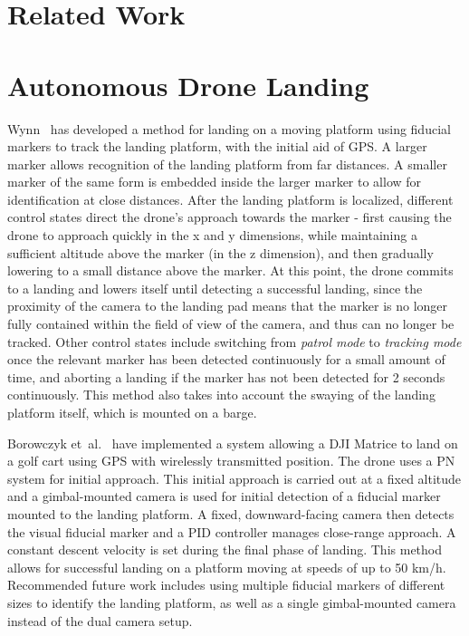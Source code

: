 \section{Related Work}

\section{Autonomous Drone Landing}

Wynn~\cite{wynn} has developed a method for landing on a moving platform using fiducial markers to track the landing platform, with the initial aid of GPS. A larger marker allows recognition of the landing platform from far distances. A smaller marker of the same form is embedded inside the larger marker to allow for identification at close distances. After the landing platform is localized, different control states direct the drone's approach towards the marker - first causing the drone to approach quickly in the x and y dimensions, while maintaining a sufficient altitude above the marker (in the z dimension), and then gradually lowering to a small distance above the marker. At this point, the drone commits to a landing and lowers itself until detecting a successful landing, since the proximity of the camera to the landing pad means that the marker is no longer fully contained within the field of view of the camera, and thus can no longer be tracked. Other control states include switching from \textit{patrol mode} to \textit{tracking mode} once the relevant marker has been detected continuously for a small amount of time, and aborting a landing if the marker has not been detected for 2 seconds continuously. This method also takes into account the swaying of the landing platform itself, which is mounted on a barge. 

Borowczyk et~al.~\cite{high_velocity_landing} have implemented a system allowing a DJI Matrice to land on a golf cart using  {GPS} with wirelessly transmitted position. The drone uses a {PN} system for initial approach. This initial approach is carried out at a fixed altitude and a gimbal-mounted camera is used for initial detection of a fiducial marker mounted to the landing platform. A fixed, downward-facing camera then detects the visual fiducial marker and a  {PID} controller manages close-range approach. A constant descent velocity is set during the final phase of landing. This method allows for successful landing on a platform moving at speeds of up to 50 km/h. Recommended future work includes using multiple fiducial markers of different sizes to identify the landing platform, as well as a single gimbal-mounted camera instead of the dual camera setup.

